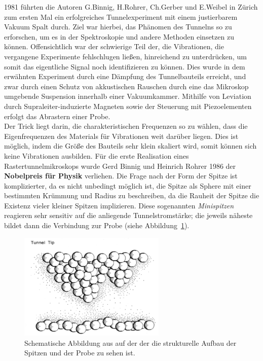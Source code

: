 1981 führten die Autoren G.Binnig, H.Rohrer,
Ch.Gerber und E.Weibel in Zürich zum ersten Mal ein erfolgreiches
Tunnelexperiment \cite{binnig1982tunneling} 
mit einem justierbarem Vakuum Spalt durch. 
Ziel war hierbei, das Phänomen des Tunnelns so zu erforschen,
um es in der Spektroskopie und andere Methoden einsetzen zu können. 
Offensichtlich war der schwierige Teil der, die Vibrationen,
die vergangene Experimente fehlschlugen ließen, hinreichend zu
unterdrücken, um somit das eigentliche Signal noch identifizieren zu
können. Dies wurde in dem erwähnten Experiment durch eine 
Dämpfung des Tunnelbauteils erreicht, und zwar durch einen Schutz
von akkustischen Rauschen durch eine das Mikroskop umgebende 
Suspension innerhalb einer Vakuumkammer. 
Mithilfe von Leviation durch Supraleiter-induzierte Magneten sowie
der Steuerung mit Piezoelementen erfolgt das Abrastern einer
Probe. \\ Der Trick liegt darin,
die charakteristischen Frequenzen so zu wählen, dass die 
Eigenfrequenzen des Materials für Vibrationen weit darüber liegen.
Dies ist möglich, indem die Größe des Bauteils sehr klein
skaliert wird, somit können sich keine Vibrationen ausbilden.
Für die erste Realisation eines Rastertunnelmikroskops
wurde Gerd Binnig und Heinrich Rohrer 1986 der \textbf{Nobelpreis
für Physik} verliehen. 
Die Frage nach der Form der Spitze ist komplizierter, da es 
nicht unbedingt möglich ist, die Spitze als Sphere mit einer
bestimmten Krümmung und Radius zu beschreiben, da die Rauheit der
Spitze die Existenz vieler kleiner Spitzen implizieren. Diese
sogenannten \textit{Minispitzen} reagieren sehr sensitiv auf die anliegende
Tunnelstromstärke; die jeweils näheste bildet dann die Verbindung
zur Probe (siehe Abbildung~\ref{fig:multitip}).\\ 
\begin{figure}
\includegraphics[width=7cm]{pics/multitip}
\caption{ Schematische Abbildung aus \cite{binnig1987scanning}
auf der der die strukturelle Aufbau der Spitzen und der Probe 
zu sehen ist.} 
 \label{fig:multitip}
\end{figure}
